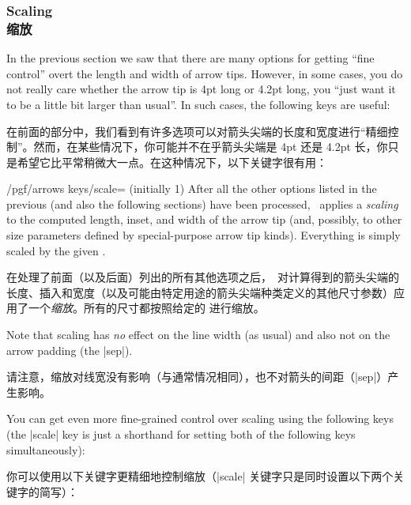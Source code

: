 \subsubsection{Scaling\\缩放}

In the previous section we saw that there are many options for getting ``fine
control'' overt the length and width of arrow tips. However, in some cases, you
do not really care whether the arrow tip is 4pt long or 4.2pt long, you ``just
want it to be a little bit larger than usual''. In such cases, the following
keys are useful:

在前面的部分中，我们看到有许多选项可以对箭头尖端的长度和宽度进行“精细控制”。然而，在某些情况下，你可能并不在乎箭头尖端是 4pt 还是 4.2pt 长，你只是希望它比平常稍微大一点。在这种情况下，以下关键字很有用：

\begin{key}{/pgf/arrows keys/scale= (initially 1)}
    After all the other options listed in the previous (and also the following
    sections) have been processed, \tikzname\ applies a \emph{scaling} to the
    computed length, inset, and width of the arrow tip (and, possibly, to other
    size parameters defined by special-purpose arrow tip kinds). Everything is
    simply scaled by the given .

    在处理了前面（以及后面）列出的所有其他选项之后，\tikzname\ 对计算得到的箭头尖端的长度、插入和宽度（以及可能由特定用途的箭头尖端种类定义的其他尺寸参数）应用了一个\emph{缩放}。所有的尺寸都按照给定的  进行缩放。
\begin{codeexample}[preamble={\usetikzlibrary{arrows.meta}}]
\end{codeexample}
    Note that scaling has \emph{no} effect on the line width (as usual) and
    also not on the arrow padding (the |sep|).

    请注意，缩放对线宽没有影响（与通常情况相同），也不对箭头的间距（|sep|）产生影响。
\end{key}

You can get even more fine-grained control over scaling using the following
keys (the |scale| key is just a shorthand for setting both of the following
keys simultaneously):

你可以使用以下关键字更精细地控制缩放（|scale| 关键字只是同时设置以下两个关键字的简写）：

